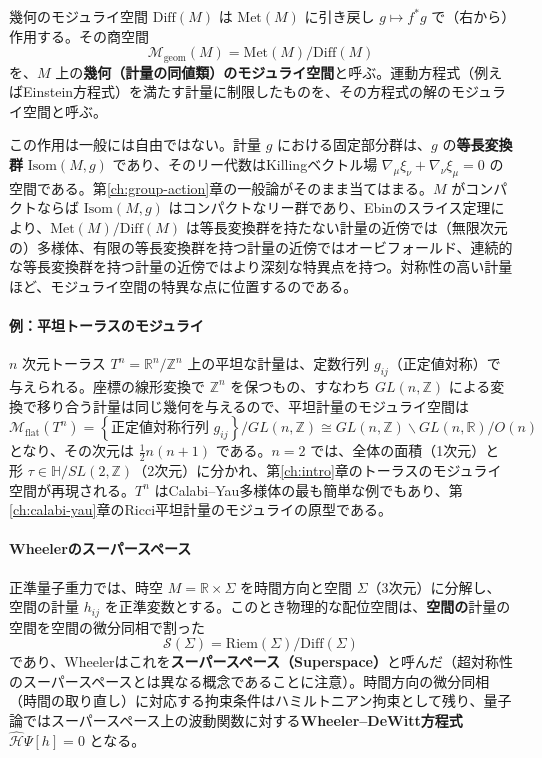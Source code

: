 \documentclass[uplatex, dvipdfmx, book]{jsbook}
\begin{document}
\begin{mydef}{幾何のモジュライ空間}{}
$\mathrm{Diff}(M)$ は $\mathrm{Met}(M)$ に引き戻し $g \mapsto f^*g$ で（右から）作用する。その商空間
\begin{equation*}
    \mathcal{M}_{\text{geom}}(M) = \mathrm{Met}(M) / \mathrm{Diff}(M)
\end{equation*}
を、$M$ 上の\textbf{幾何（計量の同値類）のモジュライ空間}と呼ぶ。運動方程式（例えばEinstein方程式）を満たす計量に制限したものを、その方程式の解のモジュライ空間と呼ぶ。
\end{mydef}

この作用は一般には自由ではない。計量 $g$ における固定部分群は、$g$ の\textbf{等長変換群} $\mathrm{Isom}(M, g)$ であり、そのリー代数はKillingベクトル場 $\nabla_\mu\xi_\nu + \nabla_\nu\xi_\mu = 0$ の空間である。第\ref{ch:group-action}章の一般論がそのまま当てはまる。$M$ がコンパクトならば $\mathrm{Isom}(M, g)$ はコンパクトなリー群であり、Ebinのスライス定理\cite{ebin1970}により、$\mathrm{Met}(M)/\mathrm{Diff}(M)$ は等長変換群を持たない計量の近傍では（無限次元の）多様体、有限の等長変換群を持つ計量の近傍ではオービフォールド、連続的な等長変換群を持つ計量の近傍ではより深刻な特異点を持つ。対称性の高い計量ほど、モジュライ空間の特異な点に位置するのである。

\paragraph{例：平坦トーラスのモジュライ}
$n$ 次元トーラス $T^n = \mathbb{R}^n/\mathbb{Z}^n$ 上の平坦な計量は、定数行列 $g_{ij}$（正定値対称）で与えられる。座標の線形変換で $\mathbb{Z}^n$ を保つもの、すなわち $GL(n, \mathbb{Z})$ による変換で移り合う計量は同じ幾何を与えるので、平坦計量のモジュライ空間は
\begin{equation}
    \mathcal{M}_{\text{flat}}(T^n) = \left\{ \text{正定値対称行列 } g_{ij} \right\} / GL(n, \mathbb{Z}) \cong GL(n, \mathbb{Z}) \backslash GL(n, \mathbb{R}) / O(n)
\end{equation}
となり、その次元は $\frac{1}{2}n(n+1)$ である。$n = 2$ では、全体の面積（1次元）と形 $\tau \in \mathbb{H}/SL(2, \mathbb{Z})$（2次元）に分かれ、第\ref{ch:intro}章のトーラスのモジュライ空間が再現される。$T^n$ はCalabi--Yau多様体の最も簡単な例でもあり、第\ref{ch:calabi-yau}章のRicci平坦計量のモジュライの原型である。

\paragraph{Wheelerのスーパースペース}
正準量子重力では、時空 $M = \mathbb{R} \times \Sigma$ を時間方向と空間 $\Sigma$（3次元）に分解し、空間の計量 $h_{ij}$ を正準変数とする。このとき物理的な配位空間は、\textbf{空間の}計量の空間を空間の微分同相で割った
\begin{equation}
    \mathcal{S}(\Sigma) = \mathrm{Riem}(\Sigma) / \mathrm{Diff}(\Sigma)
\end{equation}
であり、Wheelerはこれを\textbf{スーパースペース（Superspace）}と呼んだ（超対称性のスーパースペースとは異なる概念であることに注意）。時間方向の微分同相（時間の取り直し）に対応する拘束条件はハミルトニアン拘束として残り、量子論ではスーパースペース上の波動関数に対する\textbf{Wheeler--DeWitt方程式} $\hat{\mathcal{H}}\Psi[h] = 0$ となる。
\end{document}

